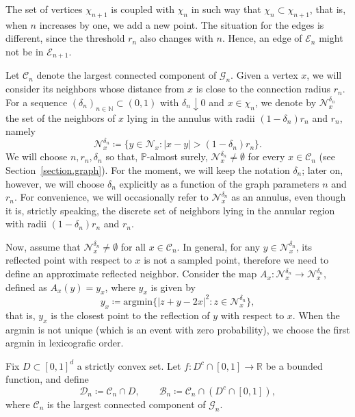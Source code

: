 \documentclass[11pt]{amsart}
\theoremstyle{definition}
\theoremstyle{remark}
\numberwithin{equation}{section}
\newcommand{\R}{{\mathbb R}}
\newcommand{\N}{{\mathbb N}}
\renewcommand{\P}{\mathbb{P}}
\newcommand{\G}{\mathcal{G}}
\newcommand{\Domain}{\mathcal{D}}
\newcommand{\B}{\mathcal{B}}
\newcommand{\C}{{\mathcal C}}
\newcommand{\Ec}{\mathcal{E}}
\newcommand{\Nc}{{\mathcal N}}
\begin{document}
The set of vertices $\chi_{n+1}$ is coupled with $\chi_n$ in such way that $\chi_{n}\subset \chi_{n+1}$, that is, when $n$ increases by one, we add a new point.
The situation for the edges is different, since the threshold $r_n$ also changes with $n$.
Hence, an edge of $\Ec_n$ might not be in $\Ec_{n+1}$.

Let $\C_n$ denote the largest connected component of $\G_n$.
Given a vertex $x$, we will consider its neighbors whose distance from $x$ is close to the connection radius $r_n$.
For a sequence $(\delta_n)_{n\in \N}\subset(0,1)$ with $\delta_n \downarrow 0$ and $x\in\chi_n$, we denote by $\Nc_x^{\delta_n}$ the set of the neighbors of $x$ lying in the annulus with radii $(1-\delta_n)r_n$ and $r_n$, namely 
\begin{equation}
\label{vecinos.borde}
\Nc_x^{\delta_n}
\coloneqq
\{
y \in \Nc_x \colon |x-y|>(1-\delta_n)r_n
\}
.
\end{equation}
We will choose $n, r_n, \delta_n$ so that, $\P$-almost surely, $\Nc_x^{\delta_n} \neq \emptyset$ for every $x\in \C_n$ (see Section~\ref{section.graph}).
For the moment, we will keep the notation $\delta_n$; later on, however, we will choose $\delta_n$ explicitly as a function of the graph parameters $n$ and $r_n$.
For convenience, we will occasionally refer to $\Nc_x^{\delta_n}$ as an annulus, even though it is, strictly speaking, the discrete set of neighbors lying in the annular region with radii $(1-\delta_n)r_n$ and $r_n$.

Now, assume that $\Nc_x^{\delta_n} \neq \emptyset$ for all $x\in \C_n$. 
In general, for any $y \in \Nc_x^{\delta_n}$, its reflected point with respect to $x$ is not a sampled point, therefore we need to define an approximate reflected neighbor.
Consider the map $A_x\colon \Nc_x^{\delta_n} \to \Nc_x^{\delta_n}$, defined as $A_x(y) = y_x$, where $y_x$ is given by
\begin{equation}\label{quasi_sym}
y_x 
\coloneqq
\text{argmin}\{ |z+y-2x|^2 \colon z \in \Nc_x^{\delta_n}\}
,
\end{equation}
that is, $y_x$ is the closest point to the reflection of $y$ with respect to $x$.
When the argmin is not unique (which is an event with zero probability), we choose the first argmin in lexicografic order.

Fix $D\subset [0,1]^d$ a strictly convex set.
Let $f\colon D^c\cap[0,1] \to \R$ be a bounded function, and define 
\[
\Domain_n \coloneqq \C_n\cap D,
\qquad 
\B_n \coloneqq \C_n \cap (D^c\cap [0,1]),
\]
where $\C_n$ is the largest connected component of $\G_n$.
\end{document}
